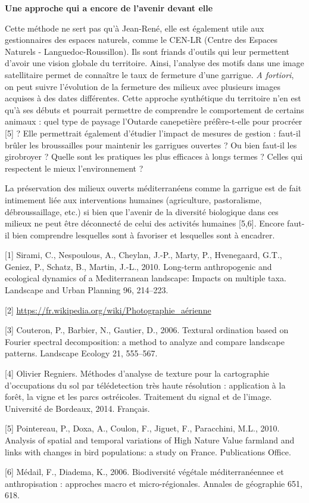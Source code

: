 \textbf{Une approche qui a encore de l'avenir devant elle}

Cette méthode ne sert pas qu'à Jean-René, elle est également utile aux gestionnaires des espaces naturels, comme le CEN-LR (Centre des Espaces Naturels - Languedoc-Roussillon). Ils sont friands d'outils qui leur permettent d'avoir une vision globale du territoire. Ainsi, l'analyse des motifs dans une image satellitaire permet de connaître le taux de fermeture d'une garrigue. \emph{A fortiori}, on peut suivre l'évolution de la fermeture des milieux avec plusieurs images acquises à des dates différentes. Cette approche synthétique du territoire n'en est qu'à ses débuts et pourrait permettre de comprendre le comportement de certains animaux : quel type de paysage l'Outarde canepetière préfère-t-elle pour procréer [5] ? Elle permettrait également d'étudier l'impact de mesures de gestion : faut-il brûler les broussailles pour maintenir les garrigues ouvertes ? Ou bien faut-il les girobroyer ? Quelle sont les pratiques les plus efficaces à longs termes ? Celles qui respectent le mieux l'environnement ?

La préservation des milieux ouverts méditerranéens comme la garrigue est de fait intimement liée aux interventions humaines (agriculture, pastoralisme, débroussaillage, etc.) si bien que l’avenir de la diversité biologique dans ces milieux ne peut être déconnecté de celui des activités humaines [5,6]. Encore faut-il bien comprendre lesquelles sont à favoriser et lesquelles sont à encadrer.

\hrulefill

[1] Sirami, C., Nespoulous, A., Cheylan, J.-P., Marty, P., Hvenegaard, G.T., Geniez, P., Schatz, B., Martin, J.-L., 2010. Long-term anthropogenic and ecological dynamics of a Mediterranean landscape: Impacts on multiple taxa. Landscape and Urban Planning 96, 214–223.

[2] \href{https://fr.wikipedia.org/wiki/Photographie_aérienne}{https://fr.wikipedia.org/wiki/Photographie\_aérienne}

[3] Couteron, P., Barbier, N., Gautier, D., 2006. Textural ordination based on Fourier spectral decomposition: a method to analyze and compare landscape patterns. Landscape Ecology 21, 555–567.

[4] Olivier Regniers. Méthodes d'analyse de texture pour la cartographie d'occupations du sol par télédetection très haute résolution : application à la forêt, la vigne et les parcs ostréicoles. Traitement du signal et de l'image. Université de Bordeaux, 2014. Français.

[5] Pointereau, P., Doxa, A., Coulon, F., Jiguet, F., Paracchini, M.L., 2010. Analysis of spatial and temporal variations of High Nature Value farmland and links with changes in bird populations: a study on France. Publications Office.

[6] Médail, F., Diadema, K., 2006. Biodiversité végétale méditerranéennee et anthropisation : approches macro et micro-régionales. Annales de géographie 651, 618.
